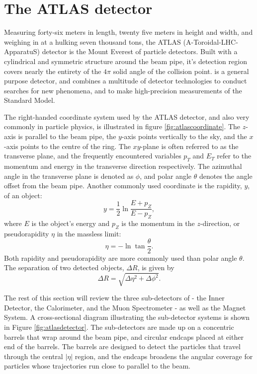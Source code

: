 \section{The ATLAS detector}\label{sec:ATLAS}

Measuring forty-six meters in length, twenty five meters in height and width, and weighing in at a hulking seven thousand tons, the ATLAS (A-Toroidal-LHC-ApparatuS) detector is the Mount Everest of particle detectors. Built with a cylindrical and symmetric structure around the beam pipe, it's detection region covers nearly the entirety of the $4\pi$ solid angle of the collision point. \ATLAS is a general purpose detector, and combines a multitude of detector technologies to conduct searches for new phenomena, and to make high-precision measurements of the Standard Model.

The right-handed coordinate system used by the ATLAS detector, and also very commonly in particle physics, is illustrated in figure \ref{fig:atlascoordinate}. The $z$-axis is parallel to the beam pipe, the $y$-axis points vertically to the sky, and the $x$-axis points to the centre of the \LHC ring. The $xy$-plane is often referred to as the transverse plane, and the frequently encountered variables $p_T$ and $E_T$ refer to the momentum and energy in the transverse direction respectively. The azimuthal angle in the transverse plane is denoted as $\phi$, and polar angle $\theta$ denotes the angle offset from the beam pipe. Another commonly used coordinate is the rapidity, $y$, of an object:
\begin{equation}
    y=\dfrac{1}{2}\ln\dfrac{E+p_Z}{E-p_Z},
\end{equation}
where $E$ is the object's energy and $p_Z$ is the momentum in the $z$-direction, or pseudorapidity $\eta$ in the massless limit:
\begin{equation}
    \eta=-\ln\tan \dfrac{\theta}{2}.
\end{equation}
Both rapidity and pseudorapidity are more commonly used than polar angle $\theta$. The separation of two detected objects, $\Delta R$, is given by
\begin{equation}
    \Delta R=\sqrt{\Delta\eta^2+\Delta\phi^2}.
\end{equation}

The rest of this section will review the three sub-detectors of \ATLAS - the Inner Detector, the Calorimeter, and the Muon Spectrometer - as well as the Magnet System. A cross-sectional diagram illustrating the sub-detector systems is shown in Figure \ref{fig:atlasdetector}. The sub-detectors are made up on a concentric barrels that wrap around the beam pipe, and circular endcaps placed at either end of the barrels. The barrels are designed to detect the particles that travel through the central $|\eta|$ region, and the endcaps broadens the angular coverage for particles whose trajectories run close to parallel to the beam. 


